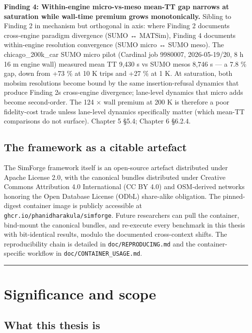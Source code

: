 \textbf{Finding 4: Within-engine micro-vs-meso mean-TT gap narrows at
saturation while wall-time premium grows monotonically.} Sibling to
Finding 2 in mechanism but orthogonal in axis: where Finding 2 documents
cross-engine paradigm divergence (SUMO ↔ MATSim), Finding 4 documents
within-engine resolution convergence (SUMO micro ↔ SUMO meso). The
chicago\_200k\_car SUMO micro pilot (Cardinal job 9980007,
2026-05-19/20, 8 h 16 m engine wall) measured mean TT 9,430 s vs SUMO
meso\textquotesingle s 8,746 s --- a 7.8 \% gap, down from +73 \% at 10
K trips and +27 \% at 1 K. At saturation, both mobsim resolutions become
bound by the same insertion-refusal dynamics that produce Finding
2\textquotesingle s cross-engine divergence; lane-level dynamics that
micro adds become second-order. The 124 × wall premium at 200 K is
therefore a poor fidelity-cost trade unless lane-level dynamics
specifically matter (which mean-TT comparisons do not surface). Chapter
5 §5.4; Chapter 6 §6.2.4.

\subsection{The framework as a citable
artefact}\label{143-the-framework-as-a-citable-artefact}

The SimForge framework itself is an open-source artefact distributed
under Apache License 2.0, with the canonical bundles distributed under
Creative Commons Attribution 4.0 International (CC BY 4.0) and
OSM-derived networks honoring the Open Database License (ODbL)
share-alike obligation. The pinned-digest container image is publicly
accessible at \texttt{ghcr.io/phanidharakula/simforge}. Future
researchers can pull the container, bind-mount the canonical bundles,
and re-execute every benchmark in this thesis with bit-identical
results, modulo the documented cross-context shifts. The reproducibility
chain is detailed in \texttt{doc/REPRODUCING.md} and the
container-specific workflow in \texttt{doc/CONTAINER\_USAGE.md}.

\begin{center}\rule{0.5\linewidth}{0.5pt}\end{center}

\section{Significance and scope}\label{15-significance-and-scope}

\subsection{What this thesis is}\label{151-what-this-thesis-is}

